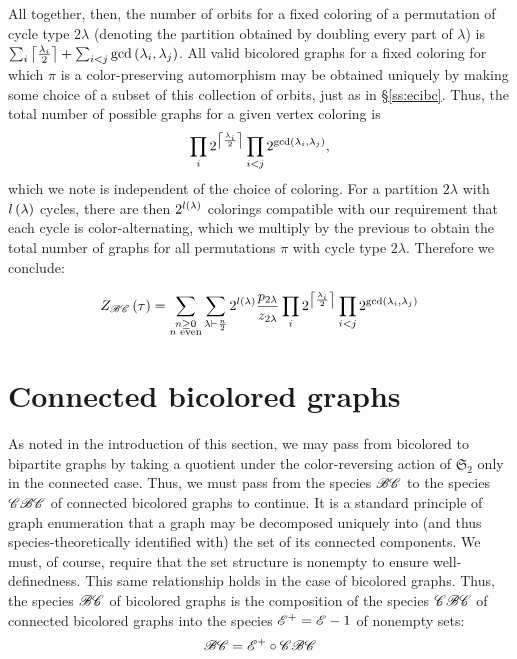\documentclass[sectionflow,singlespace,twoside,boldmathhdr]{brandiss} %
\numberwithin{section}{chapter}
\numberwithin{figure}{chapter}
\begin{document}
All together, then, the number of orbits for a fixed coloring of a permutation of cycle type $2 \lambda$ (denoting the partition obtained by doubling every part of $\lambda$) is $\sum_{i} \left\lceil {\frac{\lambda_{i}}{2}} \right\rceil + \sum_{i < j} \gcd \left( {\lambda_{i}, \lambda_{j}} \right)$.
All valid bicolored graphs for a fixed coloring for which $\pi$ is a color-preserving automorphism may be obtained uniquely by making some choice of a subset of this collection of orbits, just as in \S \ref{ss:ecibc}.
Thus, the total number of possible graphs for a given vertex coloring is
\begin{equation*}
  \prod_{i} 2^{\left\lceil {\frac{\lambda_{i}}{2}} \right\rceil} \prod_{i < j} 2^{\gcd \left( {\lambda_{i}, \lambda_{j}} \right)},
\end{equation*}
which we note is independent of the choice of coloring.
For a partition $2\lambda$ with $l \left( {\lambda} \right)$ cycles, there are then $2^{l \left( {\lambda} \right)}$ colorings compatible with our requirement that each cycle is color-alternating, which we multiply by the previous to obtain the total number of graphs for all permutations $\pi$ with cycle type $2 \lambda$.
Therefore we conclude:
\begin{theorem}
  \begin{equation}
    \label{eq:tcibc}
    Z_{\mathscr{BC}} \left( {\tau} \right) = \sum_{\substack{n \geq 0 \\ \text{$n$ even}}} \sum_{\lambda \vdash \frac{n}{2}} 2^{l \left( {\lambda} \right)} \frac{p_{2 \lambda}}{z_{2 \lambda}} \prod_{i} 2^{\left\lceil {\frac{\lambda_{i}}{2}} \right\rceil} \prod_{i < j} 2^{\gcd \left( {\lambda_{i}, \lambda_{j}} \right)}
  \end{equation}
\end{theorem}

\section{Connected bicolored graphs}\label{s:cbc}
As noted in the introduction of this section, we may pass from bicolored to bipartite graphs by taking a quotient under the color-reversing action of $\mathfrak{S}_{2}$ only in the connected case.
Thus, we must pass from the species $\mathscr{BC}$ to the species $\mathscr{CBC}$ of connected bicolored graphs to continue.
It is a standard principle of graph enumeration that a graph may be decomposed uniquely into (and thus species-theoretically identified with) the set of its connected components.
We must, of course, require that the set structure is nonempty to ensure well-definedness.
This same relationship holds in the case of bicolored graphs.
Thus, the species $\mathscr{BC}$ of bicolored graphs is the composition of the species $\mathscr{CBC}$ of connected bicolored graphs into the species $\mathscr{E}^{+} = \mathscr{E} - 1$ of nonempty sets:
\begin{equation} \mathscr{BC} = \mathscr{E}^{+} \circ \mathscr{CBC} \label{eq:bcdecomp} \end{equation}
\end{document}
